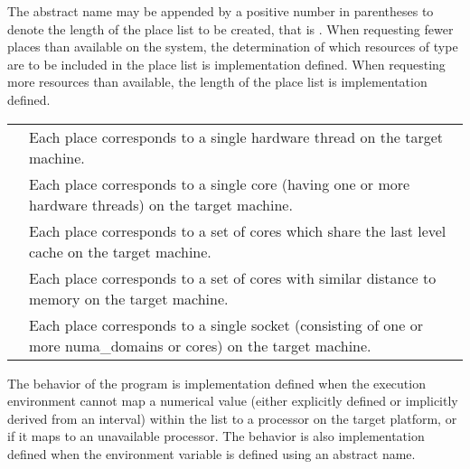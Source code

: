 The abstract name may be appended by a positive number in parentheses
to denote the length of the place list to be created, that is
. When requesting fewer places than
available on the system, the determination of which resources of type
 are to be included in the place list is implementation
defined. When requesting more resources than available, the length of the
place list is implementation defined.

\medskip
\nolinenumbers
\renewcommand{\arraystretch}{1.5}
\tablelasttail{\hline}
\begin{supertabular}{p{1.5in} p{3.5in}}
{} & Each place corresponds to a single hardware
                    thread on the target machine.\\
{}   & Each place corresponds to a single core (having
                    one or more hardware threads) on the target machine.\\
{}     & Each place corresponds to a set of cores which
                    share the last level cache on the target machine.\\
{} & Each place corresponds to a set of cores with
                    similar distance to memory on the target machine.\\
{} & Each place corresponds to a single socket (consisting
                    of one or more numa\_domains or cores) on the target
                    machine.\\
\end{supertabular}

\linenumbers

The behavior of the program is implementation defined when the execution
environment cannot map a numerical value (either explicitly defined or
implicitly derived from an interval) within the  list to
a processor on the target platform, or if it maps to an unavailable processor.
The behavior is also implementation defined when the 
environment variable is defined using an abstract name.


